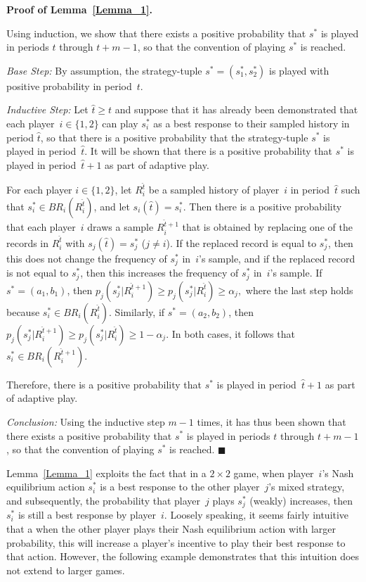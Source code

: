 \textbf{Proof of Lemma~\ref{Lemma_1}.} 

Using induction, we show that there exists a positive probability that $s^*$ is played in periods $t$ through $t+m-1$, so that the convention of playing $s^*$ is reached.

\textit{Base Step:} By assumption, the strategy-tuple $s^* = (s^*_1, s^*_2)$ is played with positive probability in period~$t$.



\textit{Inductive Step:} Let $\hat{t}\geq t$ and suppose that it has already been demonstrated that each player~$i\in\{1,2\}$ can play $s^*_i$ as a best response to their sampled history in period $\hat{t}$, so that there is a positive probability that the strategy-tuple $s^*$ is played in period~$\hat{t}$. It will be shown that there is a positive probability that $s^*$ is played in period~$\hat{t}+1$ as part of adaptive play. 

\vskip6pt

For each player $i\in \{1,2\}$, let $R_i^{\hat{t}}$ be a sampled history of player~$i$ in period~$\hat{t}$ such that $s^*_i\in BR_i(R_i^{\hat{t}})$, and let $s_i(\hat{t})=s_i^*$. Then there is a positive probability that each player~$i$ draws a sample $R_i^{\hat{t}+1}$ that is obtained by replacing one of the records in $R_i^{\hat{t}}$ with $s_j(\hat{t})=s_j^*$ ($j\neq i$). If the replaced record is equal to $s_j^*$, then this does not change the frequency of $s_j^*$ in~$i$'s sample, and if the replaced record is not equal to $s_j^*$, then this increases the frequency of $s_j^*$ in~$i$'s sample. 
If $s^* =(a_1,b_1)$, then $p_j(s_j^* | R_i^{\hat{t}+1})\geq p_j(s_j^* | R_i^{\hat{t}})\geq \alpha_j,$ where the last step holds because $s^*_i\in BR_i(R_i^{\hat{t}})$. 
Similarly, if $s^* =(a_2,b_2)$, then $p_j(s_j^* | R_i^{\hat{t}+1})\geq p_j(s_j^* | R_i^{\hat{t}})\geq 1-\alpha_j.$ 
In both cases,  it follows that $s^*_i\in BR_i(R_i^{\hat{t}+1})$.

Therefore, there is a positive probability that $s^*$ is played in period~$\hat{t}+1$ as part of adaptive play. 

\medskip
\textit{Conclusion:} Using the inductive step $m-1$ times, it has thus been shown that there exists a positive probability that $s^*$ is played in periods $t$ through $t+m-1$, so that the convention of playing $s^*$ is reached.
$\blacksquare$



\bigskip

Lemma~\ref{Lemma_1} exploits the fact that in a $2\times 2$ game, when player~$i$'s Nash equilibrium action $s_i^*$ is a best response to the other player~$j$'s mixed strategy, and subsequently, the probability that player~$j$ plays $s_j^*$ (weakly) increases, then $s_i^*$ is still a best response by player~$i$. 
Loosely speaking, it seems fairly intuitive that a when the other player plays their Nash equilibrium action with larger probability, this will increase a player's incentive to play their best response to that action. However, the following example demonstrates that this intuition does not extend to larger games. 


